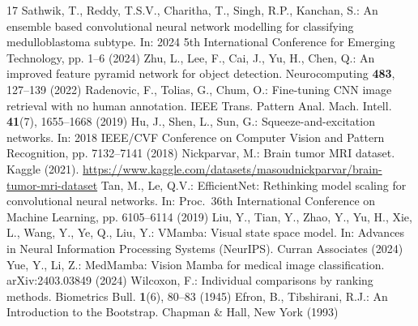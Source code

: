 \documentclass[runningheads]{llncs}
\begin{document}
\begin{thebibliography}{17}
Sathwik, T., Reddy, T.S.V., Charitha, T., Singh, R.P., Kanchan, S.: An ensemble based convolutional neural network modelling for classifying medulloblastoma subtype. In: 2024 5th International Conference for Emerging Technology, pp. 1--6 (2024)
Zhu, L., Lee, F., Cai, J., Yu, H., Chen, Q.: An improved feature pyramid network for object detection. Neurocomputing \textbf{483}, 127--139 (2022)
Radenovic, F., Tolias, G., Chum, O.: Fine-tuning CNN image retrieval with no human annotation. IEEE Trans. Pattern Anal. Mach. Intell. \textbf{41}(7), 1655--1668 (2019)
Hu, J., Shen, L., Sun, G.: Squeeze-and-excitation networks. In: 2018 IEEE/CVF Conference on Computer Vision and Pattern Recognition, pp. 7132--7141 (2018)
Nickparvar, M.: Brain tumor MRI dataset. Kaggle (2021). \url{https://www.kaggle.com/datasets/masoudnickparvar/brain-tumor-mri-dataset}
Tan, M., Le, Q.V.: EfficientNet: Rethinking model scaling for convolutional neural networks. In: Proc.\ 36th International Conference on Machine Learning, pp. 6105--6114 (2019)
Liu, Y., Tian, Y., Zhao, Y., Yu, H., Xie, L., Wang, Y., Ye, Q., Liu, Y.: VMamba: Visual state space model. In: Advances in Neural Information Processing Systems (NeurIPS). Curran Associates (2024)
Yue, Y., Li, Z.: MedMamba: Vision Mamba for medical image classification. arXiv:2403.03849 (2024)
Wilcoxon, F.: Individual comparisons by ranking methods. Biometrics Bull. \textbf{1}(6), 80--83 (1945)
Efron, B., Tibshirani, R.J.: An Introduction to the Bootstrap. Chapman \& Hall, New York (1993)
\end{thebibliography}
\end{document}
